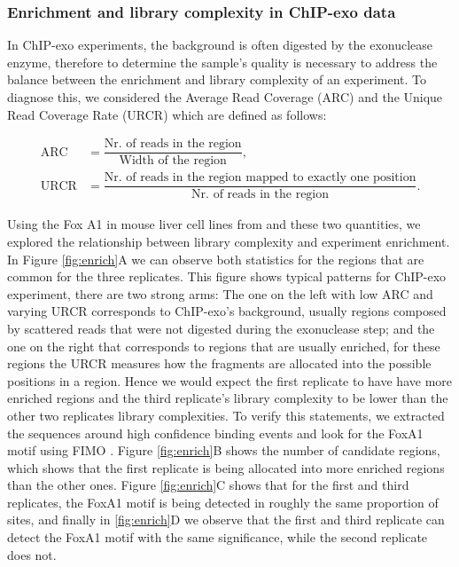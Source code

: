 \documentclass{bmcart}\usepackage[]{graphicx}\usepackage[]{color}
\begin{document}
\subsubsection{Enrichment and library complexity in ChIP-exo data}

In ChIP-exo experiments, the background is often digested by the
exonuclease enzyme, therefore to determine the sample's quality is
necessary to address the balance between the enrichment and library
complexity of an experiment. To diagnose this, we considered the
Average Read Coverage (ARC) and the Unique Read Coverage Rate (URCR)
which are defined as follows:

\begin{align*}
  \text{ARC} &= \dfrac{\text{Nr. of reads in the region}}{\text{Width of the region}}, \\
  \text{URCR} &= \dfrac{\text{Nr. of reads in the region mapped to
      exactly one position}}{\text{Nr. of reads in the region}}.
\end{align*}

Using the Fox A1 in mouse liver cell lines from \cite{exoillumina} and
these two quantities, we explored the relationship between library
complexity and experiment enrichment. In Figure \ref{fig:enrich}A we
can observe both statistics for the regions that are common for the
three replicates. This figure shows typical patterns for ChIP-exo
experiment, there are two strong arms: The one on the left with low
ARC and varying URCR corresponds to ChIP-exo's background, usually
regions composed by scattered reads that were not digested during the
exonuclease step; and the one on the right that corresponds to regions
that are usually enriched, for these regions the URCR measures how the
fragments are allocated into the possible positions in a region. Hence
we would expect the first replicate to have have more enriched regions
and the third replicate's library complexity to be lower than the
other two replicates library complexities. To verify this statements,
we extracted the sequences around high confidence binding events and
look for the FoxA1 motif using FIMO \cite{fimo}. Figure
\ref{fig:enrich}B shows the number of candidate regions, which shows
that the first replicate is being allocated into more enriched regions
than the other ones. Figure \ref{fig:enrich}C shows that for the first
and third replicates, the FoxA1 motif is being detected in roughly the
same proportion of sites, and finally in \ref{fig:enrich}D we observe
that the first and third replicate can detect the FoxA1 motif with the
same significance, while the second replicate does not.
\end{document}
